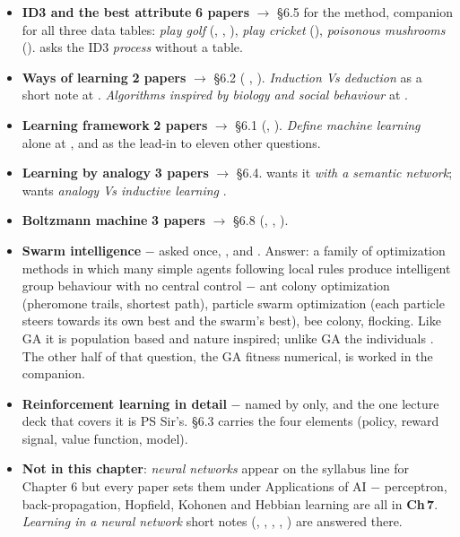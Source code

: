 \begin{itemize}
        with examples in .
  \item \textbf{ID3 and the best attribute} \textbf{6 papers} $\rightarrow$ \S6.5 for the method,
        companion for all three data tables: \emph{play golf}
        (, , ),
        \emph{play cricket} (), \emph{poisonous mushrooms}
        ().  asks the ID3 \emph{process}
        without a table.
  \item \textbf{Ways of learning} \textbf{2 papers} $\rightarrow$ \S6.2
        ( ,  ). \emph{Induction
        Vs deduction} as a short note at  .
        \emph{Algorithms inspired by biology and social behaviour} at
         .
  \item \textbf{Learning framework} \textbf{2 papers} $\rightarrow$ \S6.1
        (, ). \emph{Define machine learning} alone at
         , and as the lead-in to eleven other questions.
  \item \textbf{Learning by analogy} \textbf{3 papers} $\rightarrow$ \S6.4.
         wants it \emph{with a semantic network};
         wants \emph{analogy Vs inductive learning} .
  \item \textbf{Boltzmann machine} \textbf{3 papers} $\rightarrow$ \S6.8
        (, , ).
  \item \textbf{Swarm intelligence}  \added{} $-$ asked once,
        , and . Answer: a family of optimization methods in which many
        simple agents following local rules produce intelligent group behaviour with no
        central control $-$ ant colony optimization (pheromone trails, shortest path),
        particle swarm optimization (each particle steers towards its own best and the
        swarm's best), bee colony, flocking. Like GA it is population based and
        nature inspired; unlike GA the individuals . The other half of that question, the GA fitness numerical, is
        worked in the companion.
  \item \textbf{Reinforcement learning in detail} $-$ named by  only, and the
        one lecture deck that covers it is PS Sir's. \S6.3 carries the four elements
        (policy, reward signal, value function, model).
  \item \textbf{Not in this chapter}: \emph{neural networks} appear on the syllabus line
        for Chapter 6 but every paper sets them under Applications of AI $-$ perceptron,
        back-propagation, Hopfield, Kohonen and Hebbian learning are all in
        \textbf{Ch\,7}. \emph{Learning in a neural network} short notes (,
        , , , ) are
        answered there.
\end{itemize}

